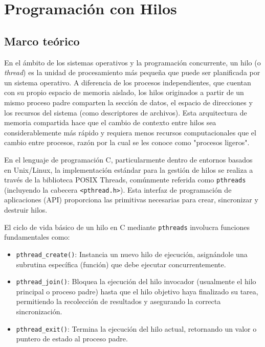 \chapter{Programación con Hilos}

\section{Marco teórico}

En el ámbito de los sistemas operativos y la programación concurrente, un hilo (o \textit{thread}) es la unidad de procesamiento más pequeña que puede ser planificada por un sistema operativo. A diferencia de los procesos independientes, que cuentan con su propio espacio de memoria aislado, los hilos originados a partir de un mismo proceso padre comparten la sección de datos, el espacio de direcciones y los recursos del sistema (como descriptores de archivos). Esta arquitectura de memoria compartida hace que el cambio de contexto entre hilos sea considerablemente más rápido y requiera menos recursos computacionales que el cambio entre procesos, razón por la cual se les conoce como "procesos ligeros".

En el lenguaje de programación C, particularmente dentro de entornos basados en Unix/Linux, la implementación estándar para la gestión de hilos se realiza a través de la biblioteca POSIX Threads, comúnmente referida como \texttt{pthreads} (incluyendo la cabecera \texttt{<pthread.h>}). Esta interfaz de programación de aplicaciones (API) proporciona las primitivas necesarias para crear, sincronizar y destruir hilos. 

El ciclo de vida básico de un hilo en C mediante \texttt{pthreads} involucra funciones fundamentales como:
\begin{itemize}
    \item \texttt{pthread\_create()}: Instancia un nuevo hilo de ejecución, asignándole una subrutina específica (función) que debe ejecutar concurrentemente.
    \item \texttt{pthread\_join()}: Bloquea la ejecución del hilo invocador (usualmente el hilo principal o proceso padre) hasta que el hilo objetivo haya finalizado su tarea, permitiendo la recolección de resultados y asegurando la correcta sincronización.
    \item \texttt{pthread\_exit()}: Termina la ejecución del hilo actual, retornando un valor o puntero de estado al proceso padre.
\end{itemize}

